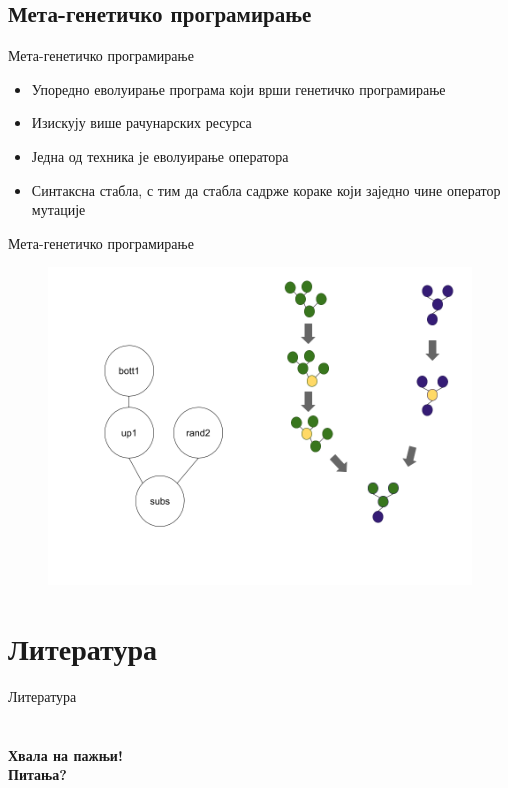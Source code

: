 \documentclass{beamer}
\begin{document}
\subsection[Мета-генетичко програмирање]{Мета-генетичко програмирање}

    \begin{frame}{Мета-генетичко програмирање}
        \begin{itemize}
            \item Упоредно еволуирање програма који врши генетичко програмирање
            \item Изискују више рачунарских ресурса
            \item Једна од техника је еволуирање оператора
            \item Синтаксна стабла, с тим да стабла садрже кораке који заједно чине оператор мутације
        \end{itemize}
    \end{frame}
    
    \begin{frame}{Мета-генетичко програмирање}
		\begin{figure}
			\includegraphics[scale=0.1]{mgp_primer.png}
		\end{figure}

    \end{frame}
    
\appendix

\section{Литература}
    \begin{frame}{Литература}
        \nocite{*}
        \printbibliography
    \end{frame}


\section{}
\begin{frame}{}
    \centering
    \Huge\bfseries{Хвала на пажњи!\\ Питања?}
\end{frame}
\end{document}

